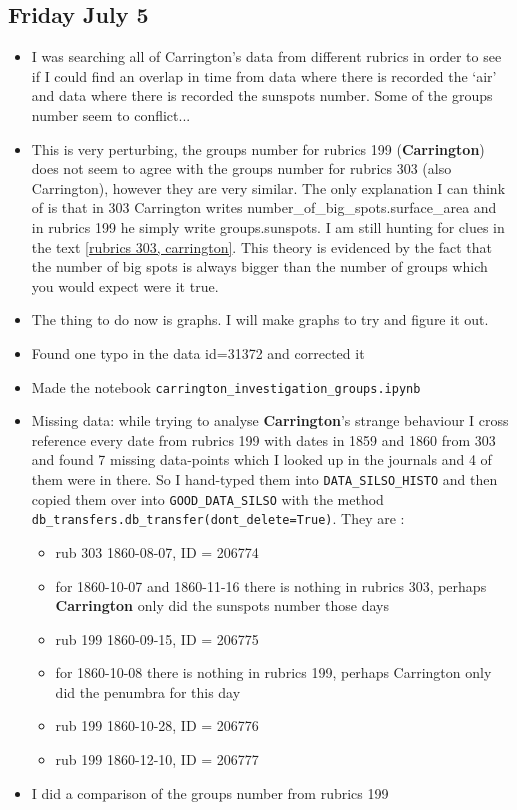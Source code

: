 \documentclass[12pt]{article}
\begin{document}
\subsection{Friday July 5}
\begin{itemize}
    \item I was searching all of Carrington's data from different rubrics in order to see if I could find an overlap in time from data where there is recorded the `air' and data where there is recorded the sunspots number. Some of the groups number seem to conflict...
    \item This is very perturbing, the groups number for rubrics 199 (\textbf{Carrington}) does not seem to agree with the groups number for rubrics 303 (also Carrington), however they are very similar. The only explanation I can think of is that in 303 Carrington writes number\_of\_big\_spots.surface\_area and in rubrics 199 he simply write groups.sunspots. I am still hunting for clues in the text \ref{rubrics 303, carrington}. This theory is evidenced by the fact that the number of big spots is always bigger than the number of groups which you would expect were it true.
    \item The thing to do now is graphs. I will make graphs to try and figure it out.
    \item Found one typo in the data id=31372 and corrected it
    \item Made the notebook \texttt{carrington\_investigation\_groups.ipynb}
    \item Missing data: while trying to analyse \textbf{Carrington}'s strange behaviour I cross reference every date from rubrics 199 with dates in 1859 and 1860 from 303 and found 7 missing data-points which I looked up in the journals and 4 of them were in there. So I hand-typed them into \texttt{DATA\_SILSO\_HISTO} and then copied them over into \texttt{GOOD\_DATA\_SILSO} with the method \texttt{db\_transfers.db\_transfer(dont\_delete=True)}. They are :
    \begin{itemize}
        \item rub 303 1860-08-07, ID = 206774
        \item for 1860-10-07 and 1860-11-16 there is nothing in rubrics 303, perhaps \textbf{Carrington} only did the sunspots number those days
        \item rub 199 1860-09-15, ID = 206775
        \item for 1860-10-08 there is nothing in rubrics 199, perhaps Carrington only did the penumbra for this day
        \item rub 199 1860-10-28, ID = 206776
        \item rub 199 1860-12-10, ID = 206777
    \end{itemize}
    \item I did a comparison of the groups number from rubrics 199


\end{itemize}
\end{document}
